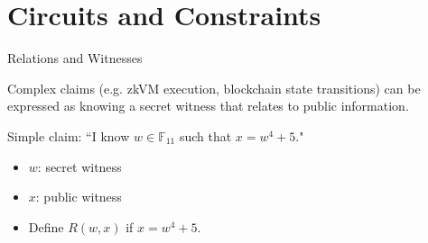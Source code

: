 \documentclass[aspectratio=169,11pt]{beamer}
\begin{document}
\section{Circuits and Constraints}

\begin{frame}{Relations and Witnesses}

Complex claims (e.g. zkVM execution, blockchain state transitions) can be expressed as knowing a secret witness that relates to public information.
\pause

Simple claim: ``I know $w \in \mathbb F_{11}$ such that $x = w^4 + 5$."
\pause

\begin{itemize}
\item $w$: secret witness
\item $x$: public witness
\item Define $R(w, x)$ if $x = w^4 + 5$.
\end{itemize}
\end{frame}
\end{document}
